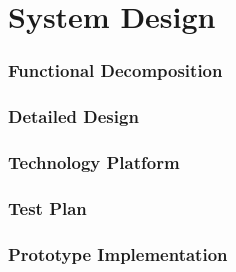 \section{System Design}

\begin{frame}
\frametitle{Functional Decomposition}


\end{frame}

\begin{frame}
\frametitle{Detailed Design}


\end{frame}

\begin{frame}
\frametitle{Technology Platform}


\end{frame}

\begin{frame}
\frametitle{Test Plan}


\end{frame}

\begin{frame}
\frametitle{Prototype Implementation}


\end{frame}
